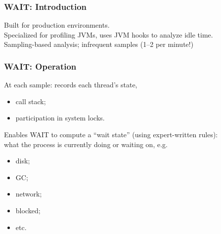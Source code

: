 \begin{frame}
  \frametitle{WAIT: Introduction}


Built for production environments.\\[1em]

Specialized for profiling JVMs, uses JVM hooks to analyze idle time.\\[1em]

Sampling-based analysis; infrequent samples (1--2 per minute!)

\end{frame}


\begin{frame}
  \frametitle{WAIT: Operation}


  At each sample: records each thread's state,
\begin{itemize}
\item call stack;
\item participation in system locks.
\end{itemize}

  Enables WAIT to compute a ``wait state'' (using expert-written rules): \\
what the process is currently doing or waiting on, e.g.
\begin{itemize}
\item disk;
\item GC;
\item network; 
\item blocked; 
\item etc.
\end{itemize}


\end{frame}


